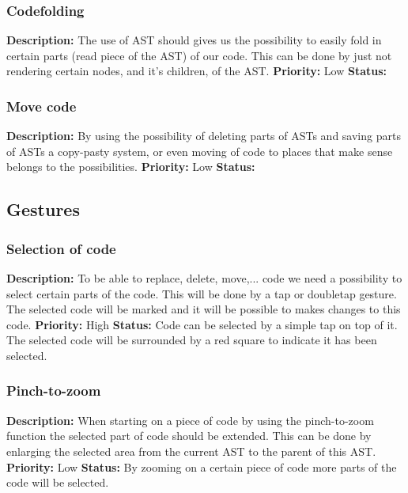 \documentclass[a4paper,12pt]{report}
\begin{document}
\subsubsection{Codefolding}
\textbf{Description: }The use of AST should gives us the possibility to easily fold in certain parts (read piece of the AST) of our code. This can be done by just not
rendering certain nodes, and it's children, of the AST. \newline
\textbf{Priority:} Low \newline
\textbf{Status: } \newline
\subsubsection{Move code}
\textbf{Description: } By using the possibility of deleting parts of ASTs and saving parts of ASTs a copy-pasty system, or even moving of code to places that make sense belongs
to the possibilities.\newline
\textbf{Priority:} Low \newline
\textbf{Status: } \newline
\subsection{Gestures}
\subsubsection{Selection of code}
\textbf{Description: } To be able to replace, delete, move,... code we need a possibility to select certain parts of the code. This will be done
by a tap or doubletap gesture. The selected code will be marked and it will be possible to makes changes to this code.\newline
\textbf{Priority:} High \newline
\textbf{Status: } Code can be selected by a simple tap on top of it. The selected code will be surrounded by a red square to indicate it has been selected. \newline
\subsubsection{Pinch-to-zoom}
\textbf{Description: }When starting on a piece of code by using the pinch-to-zoom function the selected part of code should be extended. This can be done by enlarging the selected
area from the current AST to the parent of this AST. \newline
\textbf{Priority:} Low \newline
\textbf{Status: } By zooming on a certain piece of code more parts of the code will be selected.\newline
\end{document}

